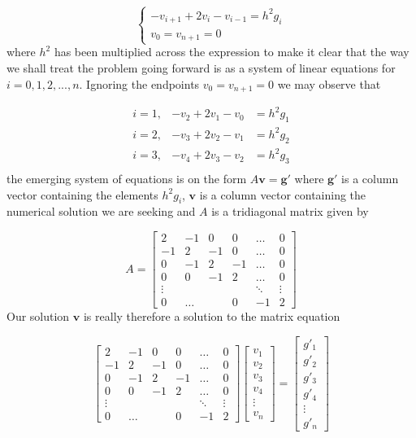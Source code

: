 \documentclass[a4paper, english]{amsart} %
\begin{document}
\begin{equation}
	\begin{cases}
	-v_{i+1}+2v_i -v_{i-1} = h^2g_i\\
	v_0 = v_{n+1} = 0
	\end{cases}
\end{equation}
where $h^2$ has been multiplied across the expression to make it clear that the way we shall treat the problem going forward is as a system of linear equations for $i = 0,1,2,...,n$. Ignoring the endpoints $v_0 = v_{n+1} = 0$ we may observe that

\begin{eqnarray*}
	i = 1, &-v_2 + 2v_1 -v_0 &= h^2g_1 \\
	i = 2, &-v_3 + 2v_2 -v_1 &= h^2g_2 \\
	i = 3, &-v_4 + 2v_3 -v_2 &= h^2g_3 \\
\end{eqnarray*}
the emerging system of equations is on the form $A\mathbf{v} = \mathbf{g}'$ where $\mathbf{g}'$ is a column vector containing the elements $h^2g_i$, $\mathbf{v}$ is a column vector containing the numerical solution we are seeking and $A$ is a tridiagonal matrix given by 

\begin{equation}
A = 
\begin{bmatrix}
2 & -1 & 0 & 0 & \hdots & 0 \\
-1 & 2 & -1 & 0 & \hdots & 0 \\
0 & -1 & 2 & -1 & \hdots & 0 \\
0 & 0 & -1 & 2 & \hdots & 0 \\
\vdots &  &  & & \ddots & \vdots \\
0 & \hdots & & 0 & -1 & 2  
\end{bmatrix}
\label{Eq_Amatrix}
\end{equation}
\newpage
Our solution $\mathbf{v}$ is really therefore a solution to the matrix equation

\begin{equation}
	\begin{bmatrix}
	2 & -1 & 0 & 0 & \hdots & 0 \\
	-1 & 2 & -1 & 0 & \hdots & 0 \\
	0 & -1 & 2 & -1 & \hdots & 0 \\
	0 & 0 & -1 & 2 & \hdots & 0 \\
	\vdots &  &  & & \ddots & \vdots \\
	0 & \hdots & & 0 & -1 & 2  
	\end{bmatrix}
	\begin{bmatrix}
	v_1\\v_2\\v_3\\v_4\\ \vdots\\ v_n
	\end{bmatrix}
	= 
	\begin{bmatrix}
	g'_1\\g'_2\\g'_3\\g'_4\\\vdots\\g'_n
	\end{bmatrix}
\end{equation}
\end{document}
